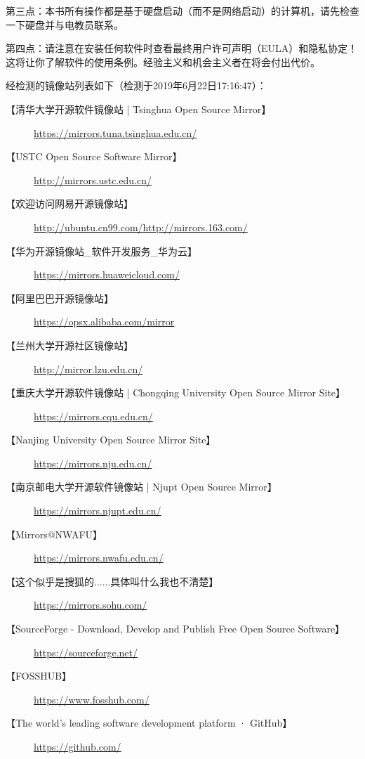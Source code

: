 第三点：本书所有操作都是基于硬盘启动（而不是网络启动）的计算机，请先检查一下硬盘并与电教员联系。\par 
第四点：请注意在安装任何软件时查看最终用户许可声明（EULA）和隐私协定！这将让你了解软件的使用条例。经验主义和机会主义者在将会付出代价。
\begin{center}\Large {\color{red}{本书将不会提供任何有关破解专有软件的方法\\或进行反向工程、反向汇编、反向编译的知识。}\normalall}\end{center}
经检测的镜像站列表如下（检测于2019年6月22日17:16:47）：
\begin{description}
	\item [【清华大学开源软件镜像站 | Tsinghua Open Source Mirror】]\url{https://mirrors.tuna.tsinghua.edu.cn/}
	\item [【USTC Open Source Software Mirror】]\url{http://mirrors.ustc.edu.cn/}
	\item [【欢迎访问网易开源镜像站】]\url{http://ubuntu.cn99.com/}\url{http://mirrors.163.com/}
	\item [【华为开源镜像站\_软件开发服务\_华为云】]\url{https://mirrors.huaweicloud.com/}
	\item [【阿里巴巴开源镜像站】]\url{https://opsx.alibaba.com/mirror}
	\item [【兰州大学开源社区镜像站】]\url{http://mirror.lzu.edu.cn/}
	\item [【重庆大学开源软件镜像站 | Chongqing University Open Source Mirror Site】] \url{https://mirrors.cqu.edu.cn/}
	\item [【Nanjing University Open Source Mirror Site】] \url{https://mirrors.nju.edu.cn/}
	\item [【南京邮电大学开源软件镜像站 | Njupt Open Source Mirror】]\url{https://mirrors.njupt.edu.cn/}
	\item [【Mirrors@NWAFU】]\url{https://mirrors.nwafu.edu.cn/}
	\item [【这个似乎是搜狐的......具体叫什么我也不清楚】]\url{https://mirrors.sohu.com/}
	\item [【SourceForge - Download, Develop and Publish Free Open Source Software】] \url{https://sourceforge.net/}
	\item [【FOSSHUB】] \url{https://www.fosshub.com/}
	\item [【The world’s leading software development platform · GitHub】] \url{https://github.com/}
\end{description}
